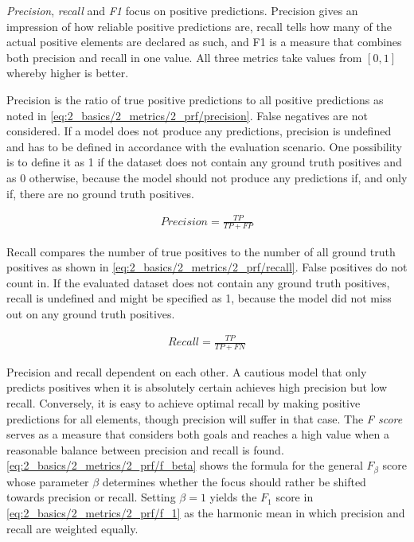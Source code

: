 \emph{Precision}, \emph{recall} and \emph{F1} focus on positive predictions. Precision gives an impression of how reliable positive predictions are, recall tells how many of the actual positive elements are declared as such, and F1 is a measure that combines both precision and recall in one value. All three metrics take values from $[0, 1]$ whereby higher is better.

Precision is the ratio of true positive predictions to all positive predictions as noted in \autoref{eq:2_basics/2_metrics/2_prf/precision}. False negatives are not considered. If a model does not produce any predictions, precision is undefined and has to be defined in accordance with the evaluation scenario. One possibility is to define it as 1 if the dataset does not contain any ground truth positives and as 0 otherwise, because the model should not produce any predictions if, and only if, there are no ground truth positives.

\begin{align}
    Precision = \frac{TP}{TP + FP}
    \label{eq:2_basics/2_metrics/2_prf/precision}
\end{align}

Recall compares the number of true positives to the number of all ground truth positives as shown in \autoref{eq:2_basics/2_metrics/2_prf/recall}. False positives do not count in. If the evaluated dataset does not contain any ground truth positives, recall is undefined and might be specified as 1, because the model did not miss out on any ground truth positives.

\begin{align}
    Recall = \frac{TP}{TP + FN}
    \label{eq:2_basics/2_metrics/2_prf/recall}
\end{align}

Precision and recall dependent on each other. A cautious model that only predicts positives when it is absolutely certain achieves high precision but low recall. Conversely, it is easy to achieve optimal recall by making positive predictions for all elements, though precision will suffer in that case. The \emph{F score} serves as a measure that considers both goals and reaches a high value when a reasonable balance between precision and recall is found. \autoref{eq:2_basics/2_metrics/2_prf/f_beta} shows the formula for the general $F_\beta$ score whose parameter $\beta$ determines whether the focus should rather be shifted towards precision or recall. Setting $\beta = 1$ yields the $F_1$ score in \autoref{eq:2_basics/2_metrics/2_prf/f_1} as the harmonic mean in which precision and recall are weighted equally.

